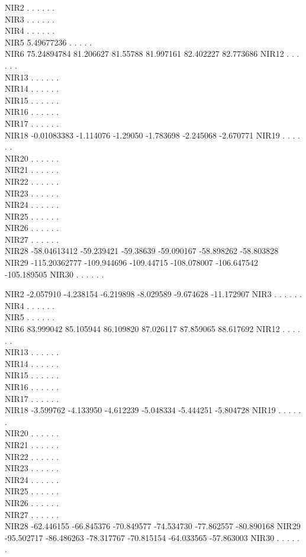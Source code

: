 \documentclass[
]{article}
\begin{document}
NIR2 . . . . . .\\
NIR3 . . . . . .\\
NIR4 . . . . . .\\
NIR5 5.49677236 . . . . .\\
NIR6 75.24894784 81.206627 81.55788 81.997161 82.402227 82.773686 NIR12
. . . . . .\\
NIR13 . . . . . .\\
NIR14 . . . . . .\\
NIR15 . . . . . .\\
NIR16 . . . . . .\\
NIR17 . . . . . .\\
NIR18 -0.01083383 -1.114076 -1.29050 -1.783698 -2.245068 -2.670771 NIR19
. . . . . .\\
NIR20 . . . . . .\\
NIR21 . . . . . .\\
NIR22 . . . . . .\\
NIR23 . . . . . .\\
NIR24 . . . . . .\\
NIR25 . . . . . .\\
NIR26 . . . . . .\\
NIR27 . . . . . .\\
NIR28 -58.04613412 -59.239421 -59.38639 -59.090167 -58.898262 -58.803828
NIR29 -115.20362777 -109.944696 -109.44715 -108.078007 -106.647542
-105.189505 NIR30 . . . . . .

NIR2 -2.057910 -4.238154 -6.219898 -8.029589 -9.674628 -11.172907 NIR3 .
. . . . .\\
NIR4 . . . . . .\\
NIR5 . . . . . .\\
NIR6 83.999042 85.105944 86.109820 87.026117 87.859065 88.617692 NIR12 .
. . . . .\\
NIR13 . . . . . .\\
NIR14 . . . . . .\\
NIR15 . . . . . .\\
NIR16 . . . . . .\\
NIR17 . . . . . .\\
NIR18 -3.599762 -4.133950 -4.612239 -5.048334 -5.444251 -5.804728 NIR19
. . . . . .\\
NIR20 . . . . . .\\
NIR21 . . . . . .\\
NIR22 . . . . . .\\
NIR23 . . . . . .\\
NIR24 . . . . . .\\
NIR25 . . . . . .\\
NIR26 . . . . . .\\
NIR27 . . . . . .\\
NIR28 -62.446155 -66.845376 -70.849577 -74.534730 -77.862557 -80.890168
NIR29 -95.502717 -86.486263 -78.317767 -70.815154 -64.033565 -57.863003
NIR30 . . . . . .
\end{document}
